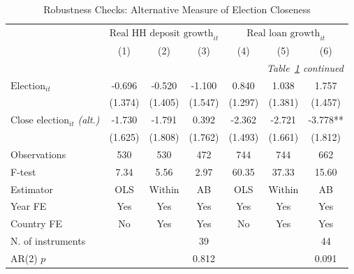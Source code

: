 \begin{longtable}{m{5.5cm}*{6}{c}}                                         \caption{Robustness Checks: Alternative Measure of Election Closeness\label{robustindices3}}\\                                         \toprule                                         &\multicolumn{3}{c}{$\text{Real HH deposit growth}_{it}$} & \multicolumn{3}{c}{$\text{Real loan growth}_{it}$} \\ \cmidrule(lr){2-4} \cmidrule(lr){5-7}
                    &         (1)   &         (2)   &         (3)   &         (4)   &         (5)   &         (6)   \\
\midrule\endfirsthead                                         \multicolumn{7}{r}{\textit{Table~\ref{robustindices3} continued}} \\                                         \toprule\endhead\midrule\endfoot\endlastfoot
$\text{Election}_{it}$&      -0.696   &      -0.520   &      -1.100   &       0.840   &       1.038   &       1.757   \\
                    &     (1.374)   &     (1.405)   &     (1.547)   &     (1.297)   &     (1.381)   &     (1.457)   \\
$\text{Close election}_{it}$ \textit{(alt.)}&      -1.730   &      -1.791   &       0.392   &      -2.362   &      -2.721   &      -3.778** \\
                    &     (1.625)   &     (1.808)   &     (1.762)   &     (1.493)   &     (1.661)   &     (1.812)   \\
\midrule
Observations        &         530   &         530   &         472   &         744   &         744   &         662   \\
F-test              &        7.34   &        5.56   &        2.97   &       60.35   &       37.33   &       15.60   \\
Estimator           &         OLS   &      Within   &          AB   &         OLS   &      Within   &          AB   \\
Year FE             &         Yes   &         Yes   &         Yes   &         Yes   &         Yes   &         Yes   \\
Country FE          &          No   &         Yes   &         Yes   &          No   &         Yes   &         Yes   \\
N. of instruments   &               &               &          39   &               &               &          44   \\
AR(2) \(p\)         &               &               &       0.812   &               &               &       0.091   \\

\end{longtable}
